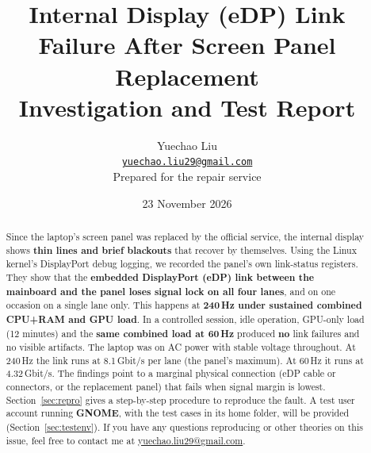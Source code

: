 \documentclass[11pt,a4paper]{article}
\title{\textbf{Internal Display (eDP) Link Failure After Screen Panel Replacement}\\[4pt]
\large Investigation and Test Report}
\author{Yuechao Liu\\ \href{mailto:yuechao.liu29@gmail.com}{\texttt{yuechao.liu29@gmail.com}}\\[6pt] \small Prepared for the repair service}
\date{23 November 2026}
\begin{document}
\maketitle

\begin{abstract}
\noindent Since the laptop's screen panel was replaced by the official service, the internal display shows
\textbf{thin lines and brief blackouts} that recover by themselves. Using the Linux kernel's DisplayPort debug
logging, we recorded the panel's own link-status registers. They show that the \textbf{embedded DisplayPort (eDP) link between
the mainboard and the panel loses signal lock on all four lanes}, and on one occasion on a single lane only. This happens at \textbf{240\,Hz under
sustained combined CPU+RAM and GPU load}. In a controlled session, idle operation, GPU-only load (12 minutes) and the
\textbf{same combined load at 60\,Hz} produced \textbf{no} link failures and no visible artifacts. The laptop was on AC power with stable voltage throughout. At 240\,Hz the link runs at
8.1\,Gbit/s per lane (the panel's maximum). At 60\,Hz it runs at 4.32\,Gbit/s. The findings point to a marginal physical
connection (eDP cable or connectors, or the replacement panel) that fails when signal margin is lowest. Section~\ref{sec:repro} gives a
step-by-step procedure to reproduce the fault. A test user account running \textbf{GNOME}, with the test cases in its home folder, will be provided
(Section~\ref{sec:testenv}). If you have any questions reproducing or other theories on this issue, feel free to contact me at \href{mailto:yuechao.liu29@gmail.com}{yuechao.liu29@gmail.com}.
\end{abstract}

\tableofcontents
\newpage

\end{document}
